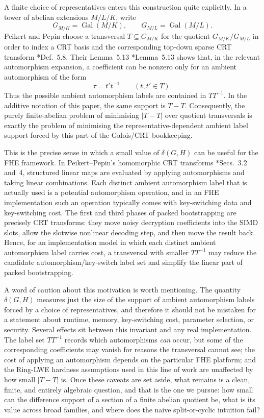 \documentclass[reqno]{amsart}
\numberwithin{equation}{section}
\theoremstyle{definition}
\begin{document}
A finite choice of representatives enters this construction quite
explicitly.  In a tower of abelian extensions \(M/L/K\), write
\[
        G_{M/K}=\operatorname{Gal}(M/K),
        \qquad
        G_{M/L}=\operatorname{Gal}(M/L).
\]
Peikert and Pepin choose a transversal
\(T\subseteq G_{M/K}\) for the quotient \(G_{M/K}/G_{M/L}\) in order to
index a CRT basis and the corresponding top-down sparse CRT transform
\cite{PeikertPepinViveGalois1}*{Def.~5.8}.
Their Lemma~5.13 \cite{PeikertPepinViveGalois1}*{Lemma~5.13} shows that, in the
relevant automorphism expansion, a coefficient can be nonzero only for an
ambient automorphism of the form
\[
        \tau=t't^{-1}
        \qquad (t,t'\in T).
\]
Thus the possible ambient automorphism labels are contained in \(TT^{-1}\).  In
the additive notation of this paper, the same support is \(T-T\).  Consequently,
the purely finite-abelian problem of
minimising \(|T-T|\) over quotient transversals is exactly the problem of
minimising the representative-dependent ambient label support forced by
this part of the Galois/CRT bookkeeping.

This is the precise sense in which a small value of \(\delta(G,H)\) can
be useful for the FHE framework.  In Peikert--Pepin's homomorphic CRT
transforms \cite{PeikertPepinViveGalois1}*{Secs.~3.2 and~4}, structured
linear maps are evaluated by applying automorphisms and taking linear
combinations.  Each distinct ambient automorphism label that is actually
used is a potential automorphism operation, and in an FHE implementation
such an operation typically comes with key-switching data and
key-switching cost.  The first and third phases of packed bootstrapping
are precisely CRT transforms: they move noisy decryption coefficients
into the SIMD slots, allow the slotwise nonlinear decoding step, and
then move the result back.  Hence, for an implementation model in which
each distinct ambient automorphism label carries cost, a transversal
with smaller \(TT^{-1}\) may reduce the candidate
automorphism/key-switch label set and simplify the linear part of packed
bootstrapping.

A word of caution about this motivation is worth mentioning.  The quantity \(\delta(G,H)\) measures
just the size of the support of ambient automorphism labels forced
by a choice of representatives, and therefore it should not be mistaken for a statement
about runtime, memory, key-switching cost, parameter selection, or security.
Several effects sit between this invariant and any real implementation.  The
label set \(TT^{-1}\) records which automorphisms \emph{can} occur, but some of
the corresponding coefficients may vanish for reasons the transversal cannot
see; the cost of applying an automorphism depends on the particular FHE
platform; and the Ring-LWE hardness assumptions used in this line of work are
unaffected by how small \(|T-T|\) is.  Once these caveats are set aside, what
remains is a clean, finite, and entirely algebraic question, and that is the one
we pursue: how small can the difference support of a section of a finite abelian
quotient be, what is its value across broad families, and where does the naive
split-or-cyclic intuition fail?
\end{document}
